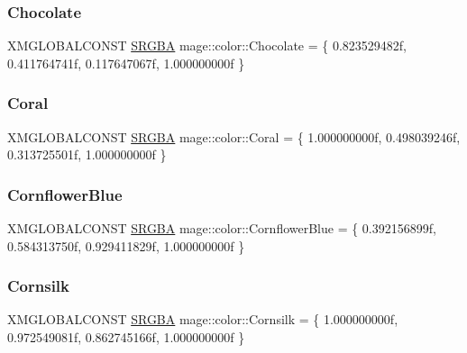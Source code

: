 \hypertarget{namespacemage_1_1color_addc2d90f52c38f52da61f5f4e0cd2f8f}{}\label{namespacemage_1_1color_addc2d90f52c38f52da61f5f4e0cd2f8f} 
\subsubsection{\texorpdfstring{Chocolate}{Chocolate}}
{\footnotesize\ttfamily X\+M\+G\+L\+O\+B\+A\+L\+C\+O\+N\+ST \hyperlink{structmage_1_1_s_r_g_b_a}{S\+R\+G\+BA} mage\+::color\+::\+Chocolate = \{ 0.\+823529482f, 0.\+411764741f, 0.\+117647067f, 1.\+000000000f \}}

\hypertarget{namespacemage_1_1color_a50e83d997f1f5f1deca879c40eea1b4e}{}\label{namespacemage_1_1color_a50e83d997f1f5f1deca879c40eea1b4e} 
\subsubsection{\texorpdfstring{Coral}{Coral}}
{\footnotesize\ttfamily X\+M\+G\+L\+O\+B\+A\+L\+C\+O\+N\+ST \hyperlink{structmage_1_1_s_r_g_b_a}{S\+R\+G\+BA} mage\+::color\+::\+Coral = \{ 1.\+000000000f, 0.\+498039246f, 0.\+313725501f, 1.\+000000000f \}}

\hypertarget{namespacemage_1_1color_a997d86bad53f38d8203cd447b7d6ecf5}{}\label{namespacemage_1_1color_a997d86bad53f38d8203cd447b7d6ecf5} 
\subsubsection{\texorpdfstring{Cornflower\+Blue}{CornflowerBlue}}
{\footnotesize\ttfamily X\+M\+G\+L\+O\+B\+A\+L\+C\+O\+N\+ST \hyperlink{structmage_1_1_s_r_g_b_a}{S\+R\+G\+BA} mage\+::color\+::\+Cornflower\+Blue = \{ 0.\+392156899f, 0.\+584313750f, 0.\+929411829f, 1.\+000000000f \}}

\hypertarget{namespacemage_1_1color_abd04686fadc4f619295a312daecf0b49}{}\label{namespacemage_1_1color_abd04686fadc4f619295a312daecf0b49} 
\subsubsection{\texorpdfstring{Cornsilk}{Cornsilk}}
{\footnotesize\ttfamily X\+M\+G\+L\+O\+B\+A\+L\+C\+O\+N\+ST \hyperlink{structmage_1_1_s_r_g_b_a}{S\+R\+G\+BA} mage\+::color\+::\+Cornsilk = \{ 1.\+000000000f, 0.\+972549081f, 0.\+862745166f, 1.\+000000000f \}}

